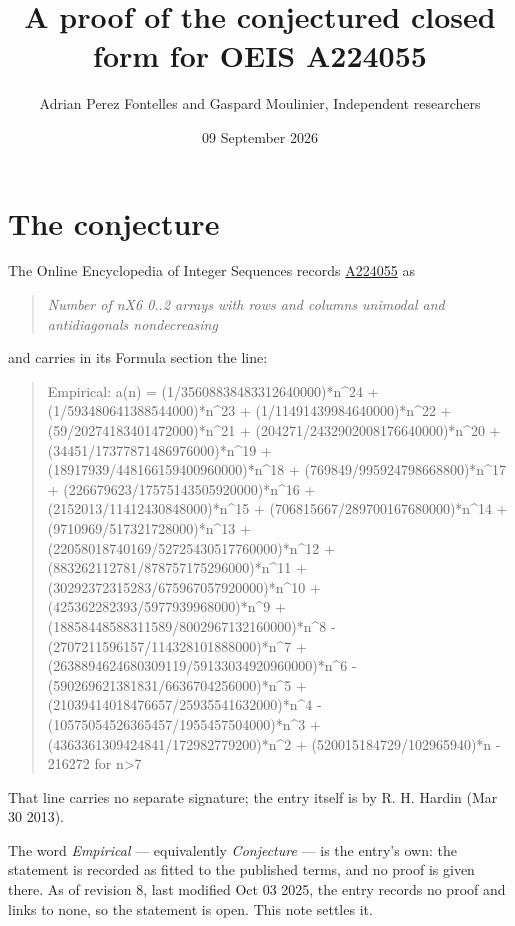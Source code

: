 \documentclass[11pt]{article}
\title{A proof of the conjectured closed form for OEIS A224055}
\author{Adrian Perez Fontelles and Gaspard Moulinier, Independent researchers}
\date{09 September 2026}
\theoremstyle{definition}
\begin{document}
\maketitle
\section{The conjecture}

The Online Encyclopedia of Integer Sequences records \href{https://oeis.org/A224055}{A224055} as

\begin{quote}\itshape Number of nX6 0..2 arrays with rows and columns unimodal and antidiagonals nondecreasing\end{quote}

and carries in its Formula section the line:

\begin{quote}\ttfamily Empirical: a(n) = (1/35608838483312640000)*n\textasciicircum{}24 + (1/593480641388544000)*n\textasciicircum{}23 + (1/11491439984640000)*n\textasciicircum{}22 + (59/20274183401472000)*n\textasciicircum{}21 + (204271/2432902008176640000)*n\textasciicircum{}20 + (34451/17377871486976000)*n\textasciicircum{}19 + (18917939/448166159400960000)*n\textasciicircum{}18 + (769849/995924798668800)*n\textasciicircum{}17 + (226679623/17575143505920000)*n\textasciicircum{}16 + (2152013/11412430848000)*n\textasciicircum{}15 + (706815667/289700167680000)*n\textasciicircum{}14 + (9710969/517321728000)*n\textasciicircum{}13 + (22058018740169/52725430517760000)*n\textasciicircum{}12 + (883262112781/878757175296000)*n\textasciicircum{}11 + (30292372315283/675967057920000)*n\textasciicircum{}10 + (425362282393/5977939968000)*n\textasciicircum{}9 + (18858448588311589/8002967132160000)*n\textasciicircum{}8 - (2707211596157/114328101888000)*n\textasciicircum{}7 + (2638894624680309119/59133034920960000)*n\textasciicircum{}6 - (590269621381831/6636704256000)*n\textasciicircum{}5 + (21039414018476657/25935541632000)*n\textasciicircum{}4 - (10575054526365457/1955457504000)*n\textasciicircum{}3 + (4363361309424841/172982779200)*n\textasciicircum{}2 + (520015184729/102965940)*n - 216272 for n>7\end{quote}

That line carries no separate signature; the entry itself is by R. H. Hardin (Mar 30 2013).

The word {\itshape Empirical} --- equivalently {\itshape Conjecture} --- is the entry's own: the statement is recorded as fitted to the published terms, and no proof is given there. As of revision 8, last modified Oct 03 2025, the entry records no proof and links to none, so the statement is open. This note settles it.
\end{document}
